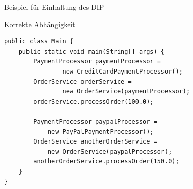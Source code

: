 \begin{frame}[fragile]{Beispiel für Einhaltung des DIP}
	\begin{exampleblock}{Korrekte Abhängigkeit}
        \begin{lstlisting}
public class Main {
    public static void main(String[] args) {
        PaymentProcessor paymentProcessor = 
                new CreditCardPaymentProcessor();
        OrderService orderService = 
                new OrderService(paymentProcessor);
        orderService.processOrder(100.0);

        PaymentProcessor paypalProcessor = 
            new PayPalPaymentProcessor();
        OrderService anotherOrderService = 
            new OrderService(paypalProcessor);
        anotherOrderService.processOrder(150.0);
    }
}
        \end{lstlisting} 		
 	\end{exampleblock}
\end{frame}
